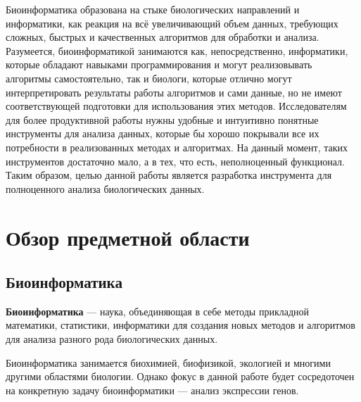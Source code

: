 \documentclass[annotation,specification]{itmo-student-thesis}
\begin{document}


\tableofcontents

\startprefacepage
Биоинформатика образована на стыке биологических направлений и информатики, как реакция на всё увеличивающий объем данных, требующих сложных, быстрых и качественных алгоритмов для обработки и анализа. Разумеется, биоинформатикой занимаются как, непосредственно, информатики, которые обладают навыками программирования и могут реализовывать алгоритмы самостоятельно, так и биологи, которые отлично могут интерпретировать результаты работы алгоритмов и сами данные, но не имеют соответствующей подготовки для использования этих методов. Исследователям для более продуктивной работы нужны удобные и интуитивно понятные инструменты для анализа данных, которые бы хорошо покрывали все их потребности в реализованных методах и алгоритмах. На данный момент, таких инструментов достаточно мало, а в тех, что есть, неполноценный функционал. Таким образом, целью данной работы является разработка инструмента для полноценного анализа биологических данных. 

\chapter{Обзор предметной области}

\section{Биоинформатика}

\textbf{Биоинформатика} --- наука, объединяющая в себе методы прикладной математики, статистики, информатики для создания новых методов и алгоритмов для анализа разного рода биологических данных.

Биоинформатика занимается биохимией, биофизикой, экологией и многими другими областями биологии. Однако фокус в данной работе будет сосредоточен на конкретную задачу биоинформатики --- анализ экспрессии генов.
\end{document}
